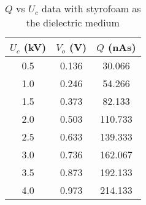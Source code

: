 \begin{table}[H]
    \centering
    \begin{tabular}{|c|c|c|}
    \hline
        $U_c$ (kV)& $V_o$ (V) & $Q$ (nAs) \\ \hline
        0.5 & 0.136 &  30.066 \\
        1.0 & 0.246 &  54.266 \\
        1.5 & 0.373 &  82.133 \\
        2.0 & 0.503 & 110.733  \\
        2.5 & 0.633 & 139.333  \\
        3.0 & 0.736 & 162.067  \\
        3.5 & 0.873 & 192.133  \\
        4.0 & 0.973 & 214.133  \\
    \hline
    \end{tabular}
    \caption{$Q$ vs $U_c$ data with styrofoam as the dielectric medium}
    \label{tab:3}
\end{table}